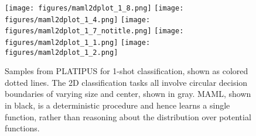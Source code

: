 \documentclass{article}
\begin{document}
\begin{figure*}[t] \centering
\texttt{[image: figures/maml2dplot\_1\_8.png]}
    \texttt{[image: figures/maml2dplot\_1\_4.png]}
    \texttt{[image: figures/maml2dplot\_1\_7\_notitle.png]}
    \texttt{[image: figures/maml2dplot\_1\_1.png]}
    \texttt{[image: figures/maml2dplot\_1\_2.png]}
    \vspace{-0.2cm}
    \caption{\small Samples from PLATIPUS for 1-shot classification, shown as colored dotted lines. The 2D classification tasks all involve circular decision boundaries of varying size and center, shown in gray. MAML, shown in black, is a deterministic procedure and hence learns a single function, rather than reasoning about the distribution over potential functions. 
    \label{fig:2dclass} }
    \vspace{-0.5cm}
\end{figure*}

\vspace{-0.1in}
\end{document}
